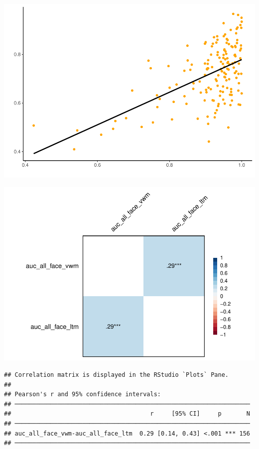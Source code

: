 \documentclass[
  man]{apa6}
\begin{document}
\includegraphics{Script_Re_Greer_2023_group1Rock_2023_files/figure-latex/unnamed-chunk-8-1.pdf}

\includegraphics{Script_Re_Greer_2023_group1Rock_2023_files/figure-latex/unnamed-chunk-10-1.pdf}

\begin{verbatim}
## Correlation matrix is displayed in the RStudio `Plots` Pane.
## 
## Pearson's r and 95% confidence intervals:
## ──────────────────────────────────────────────────────────────────
##                                       r     [95% CI]     p       N
## ──────────────────────────────────────────────────────────────────
## auc_all_face_vwm-auc_all_face_ltm  0.29 [0.14, 0.43] <.001 *** 156
## ──────────────────────────────────────────────────────────────────
\end{verbatim}
\end{document}
